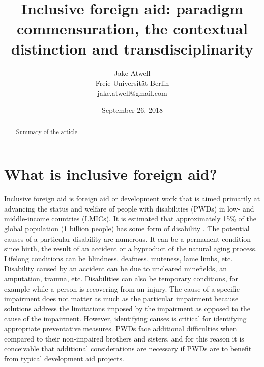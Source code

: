 \documentclass[a4paper]{article}
\begin{document}
\title{Inclusive foreign aid: paradigm commensuration, the contextual
distinction and transdisciplinarity}
\author{Jake Atwell\\
    Freie Universität Berlin\\
    jake.atwell@gmail.com
}
\date{September 26, 2018}

\maketitle



\begin{abstract}
Summary of the article.
\end{abstract}
\newpage


\tableofcontents

\newpage
{} %




\section{What is inclusive foreign aid?}

Inclusive foreign aid is foreign aid or development work that is aimed
primarily at advancing the status and welfare of people with disabilities
(PWDs) in low- and middle-income countries (LMICs). It is estimated that
approximately 15\% of the global population (1 billion people) has some form
of disability \citep{banks2017poverty}. The potential causes of a particular
disability are numerous. It can be a permanent condition since birth, the
result of an accident or a byproduct of the natural aging process. Lifelong
conditions can be blindness, deafness, muteness, lame limbs, etc. Disability
caused by an accident can be due to uncleared minefields, an amputation,
trauma, etc. Disabilities can also be temporary conditions, for example while
a person is recovering from an injury. The cause of a specific impairment does
not matter as much as the particular impairment because solutions address the
limitations imposed by the impairment as opposed to the cause of the
impairment. However, identifying causes is critical for identifying
appropriate preventative measures. PWDs face additional difficulties when
compared to their non-impaired brothers and sisters, and for this reason it is
conceivable that additional considerations are necessary if PWDs are to
benefit from typical development aid projects.
\end{document}
